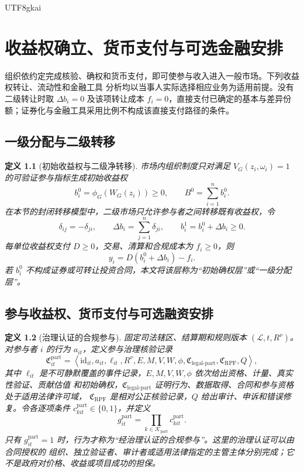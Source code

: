 \documentclass[12pt,a4paper,openany]{report}
\newtheorem{definition}{定义}[chapter]
\newcommand{\Tuple}[1]{\left\langle #1\right\rangle}
\begin{document}
\begin{CJK*}{UTF8}{gkai}
\chapter{收益权确立、货币支付与可选金融安排}
\label{chap:primary-finance}

组织依约定完成核验、确权和货币支付，即可使参与收入进入一般市场。下列收益权转让、流动性和金融工具
分析均以当事人实际选择相应业务为适用前提。没有二级转让时取 \(\Delta b_i=0\) 及该项转让成本
\(f_i=0\)，直接支付已确定的基本与差异份额；证券化与金融工具采用比例不构成该直接支付路径的条件。

\section{一级分配与二级转移}

\begin{definition}[初始收益权与二级净转移]
市场内组织制度只对满足 \(V_G(z_i,\omega_i)=1\) 的可验证参与指标生成初始收益权
\[
  b_i^0=\phi_G(W_G(z_i))\ge0,\qquad
  B^0=\sum_{i=1}^n b_i^0.
\]
在本节的封闭转移模型中，二级市场只允许参与者之间转移既有收益权，令
\[
  \delta_{ij}=-\delta_{ji},
\qquad
  \Delta b_i=\sum_{j=1}^n\delta_{ji},
\qquad
  b_i^1=b_i^0+\Delta b_i\ge0.
\]
每单位收益权支付 \(D\ge0\)，交易、清算和合规成本为 \(f_i\ge0\)，则
\[
  y_i=D(b_i^0+\Delta b_i)-f_i.
\]
若 \(b_i^0\) 不构成证券或可转让投资合同，本文将该层称为“初始确权层”或“一级分配层”。
\end{definition}

\section{参与收益权、货币支付与可选融资安排}
\label{sec:certified-participation-fiat-cycle}

\begin{definition}[治理认证的合规参与]
\label{def:governance-certified-participation}
固定司法辖区、结算期和规则版本 \((\mathcal L,t,R^\nu)\)。对参与者 \(i\) 的行为 \(a_{it}\)，定义参与治理核验记录
\[
  \mathfrak C_{it}^{\mathrm{part}}
  =
  \Tuple{
  \mathrm{id}_{it},a_{it},\ell_{it},R^\nu,
  E,M,V,W,\phi,
  \mathfrak C_{\mathrm{legal\text{-}part}},
  \mathfrak C_{\mathrm{RPF}},Q
  },
\]
其中 \(\ell_{it}\) 是不可静默覆盖的事件记录，\(E,M,V,W,\phi\) 依次给出资格、计量、真实性验证、贡献估值
和初始确权，\(\mathfrak C_{\mathrm{legal\text{-}part}}\) 证明行为、数据取得、合同和参与资格处于适用法律许可域，
\(\mathfrak C_{\mathrm{RPF}}\) 是相对公正核验记录，\(Q\) 给出审计、申诉和错误修复。令各逐项条件
\(c_{kit}^{\mathrm{part}}\in\{0,1\}\)，并定义
\[
  g_{it}^{\mathrm{part}}
  =\prod_{k\in\mathcal K_{\mathrm{part}}}c_{kit}^{\mathrm{part}}.
\]
只有 \(g_{it}^{\mathrm{part}}=1\) 时，行为才称为“经治理认证的合规参与”。这里的治理认证可以由合同授权的
组织、独立验证者、审计者或适用法律指定的主管主体分别完成；它不是政府对价格、收益或项目成功的担保。
\end{definition}


\end{CJK*}
\end{document}
